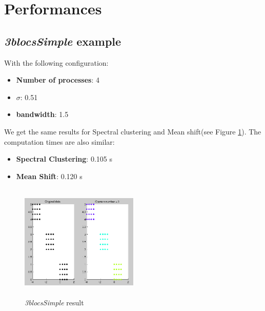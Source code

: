 \section{Performances}
\subsection{\textit{3blocsSimple} example}
With the following configuration:
\begin{itemize}
\item \textbf{Number of processes}: 4
\item \textbf{$\sigma$}: 0.51
\item \textbf{bandwidth}: 1.5
\end{itemize}
We get the same results for Spectral clustering and Mean shift(see Figure \ref{3blocsSimple}). The computation times are also similar:
\begin{itemize}
\item \textbf{Spectral Clustering}: 0.105 s
\item \textbf{Mean Shift}: 0.120 s
\end{itemize}
\begin{figure}[h!]
\includegraphics[width=0.5\textwidth, height=5.5cm]{Image/3blocsSimple.png}\centering
\caption{\textit{3blocsSimple} result\label{3blocsSimple}}
\end{figure}

